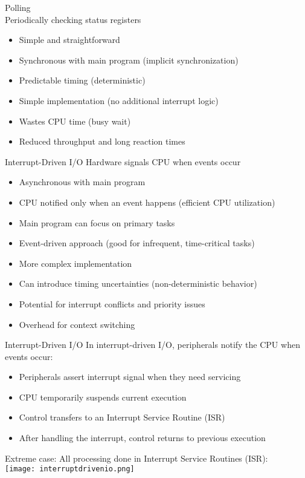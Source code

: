 \begin{minipage}{0.38\linewidth}

\begin{concept}{Polling}\\  Periodically checking status registers
    \begin{itemize}
        \item Simple and straightforward
        \item Synchronous with main program (implicit synchronization)
        \item Predictable timing (deterministic)
        \item Simple implementation (no additional interrupt logic)
        \item Wastes CPU time (busy wait)
        \item Reduced throughput and long reaction times
    \end{itemize}
\end{concept}
\end{minipage}
\begin{minipage}{0.62\linewidth}
\begin{concept}{Interrupt-Driven I/O}
 Hardware signals CPU when events occur
    \begin{itemize}
        \item Asynchronous with main program
        \item CPU notified only when an event happens (efficient CPU utilization)
        \item Main program can focus on primary tasks
        \item Event-driven approach (good for infrequent, time-critical tasks)
        \item More complex implementation
        \item Can introduce timing uncertainties (non-deterministic behavior)
        \item Potential for interrupt conflicts and priority issues
        \item Overhead for context switching
    \end{itemize}
\end{concept}
\end{minipage}

\begin{definition}{Interrupt-Driven I/O}
In interrupt-driven I/O, peripherals notify the CPU when events occur:
\begin{itemize}
    \item Peripherals assert interrupt signal when they need servicing
    \item CPU temporarily suspends current execution
    \item Control transfers to an Interrupt Service Routine (ISR)
    \item After handling the interrupt, control returns to previous execution
\end{itemize}

Extreme case: All processing done in Interrupt Service Routines (ISR):\\
\texttt{[image: interruptdrivenio.png]}

\end{definition}

